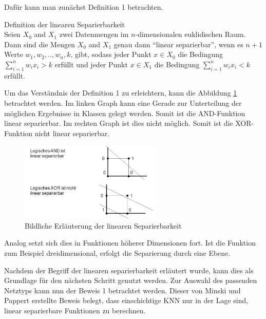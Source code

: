 Dafür kann man zunächst Definition 1 betrachten.

\begin{defi}Definition der linearen Separierbarkeit\\
Seien $X_{0}$ and $X_{1}$ zwei Datenmengen im $n$-dimensionalen euklidischen Raum. Dann sind die Mengen $X_{0}$ and $X_{1}$ genau dann  "`linear separierbar"', wenn es  $n+1$ Werte $w_{1}, w_{2},..,w_{n}, k$, gibt, sodass jeder Punkt  $x \in X_{0}$ die Bedingung $\sum^{n}_{i=1} w_{i}x_{i} > k$ erfüllt und jeder Punkt $x \in X_{1}$ die Bedingung $\sum^{n}_{i=1} w_{i}x_{i} < k$ erfüllt.
\end{defi}

Um das Verständnis der Definition 1 zu erleichtern, kann die Abbildung \ref{fig:Bildliche Erläuterung der linearen Separierbarkeit} betrachtet werden. Im linken Graph kann eine Gerade zur Unterteilung der möglichen Ergebnisse in Klassen gelegt werden. Somit ist die AND-Funktion linear separierbar. Im rechten Graph ist dies nicht möglich. Somit ist die XOR-Funktion nicht linear separierbar.  

\begin{figure}[H]
\centering
		\includegraphics[width=0.6\textwidth]{Linear_Sep.PNG}
	\caption{Bildliche Erläuterung der linearen Separierbarkeit}
	\label{fig:Bildliche Erläuterung der linearen Separierbarkeit}
\end{figure}

Analog setzt sich dies in Funktionen höherer Dimensionen fort. Ist die Funktion zum Beispiel dreidimensional, erfolgt die Separierung durch eine Ebene.

Nachdem der Begriff der linearen separierbarkeit erläutert wurde, kann dies als Grundlage für den nächsten Schritt genutzt werden. Zur Auswahl des passenden Netztyps kann nun der Beweis 1 betrachtet werden. Dieser von Minski und Pappert erstellte Beweis  belegt, dass einschichtige KNN nur in der Lage sind, linear separierbare Funktionen zu berechnen.

\newpage

